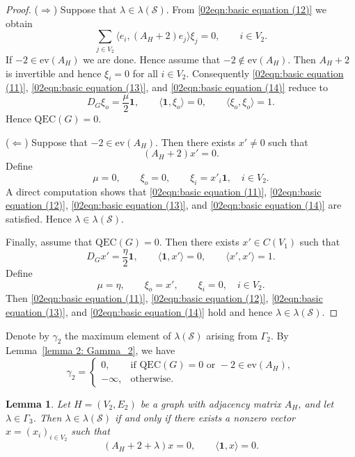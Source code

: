 \documentclass[pdflatex,sn-mathphys-num]{sn-jnl}
\theoremstyle{thmstyleone}%
\newtheorem{lemma}[theorem]{Lemma}%
\theoremstyle{thmstyletwo}%
\theoremstyle{thmstylethree}%
\begin{document}
\begin{proof}

\noindent
($\Rightarrow$)
Suppose that $\lambda\in \lambda(\mathcal S)$.
From \eqref{02eqn:basic equation (12)} we obtain
\[
\sum_{j\in V_2}\langle e_i,(A_H+2)e_j\rangle\xi_j=0, \qquad i\in V_2.
\]
If $-2\in\mathrm{ev}(A_H)$ we are done. 
Hence assume that $-2\notin\mathrm{ev}(A_H)$.
Then $A_H+2$ is invertible and hence $\xi_i=0$ for all $i\in V_2$.
Consequently \eqref{02eqn:basic equation (11)}, 
\eqref{02eqn:basic equation (13)}, and
\eqref{02eqn:basic equation (14)} reduce to
\[
D_G\xi_o=\frac{\mu}{2}\mathbf{1},\qquad
\langle \mathbf{1},\xi_o\rangle=0,\qquad
\langle \xi_o,\xi_o\rangle=1.
\]
Hence $\mathrm{QEC}(G)=0$.

\medskip

\noindent
($\Leftarrow$)
Suppose that $-2\in\mathrm{ev}(A_H)$.
Then there exists $x'\neq0$ such that
\[
(A_H+2)x'=0 .
\]
Define
\[
\mu=0,\qquad
\xi_o=0,\qquad
\xi_i=x'_i\mathbf 1 ,\quad i\in V_2 .
\]
A direct computation shows that
\eqref{02eqn:basic equation (11)}, \eqref{02eqn:basic equation (12)}, \eqref{02eqn:basic equation (13)}, and \eqref{02eqn:basic equation (14)}
are satisfied.
Hence $\lambda\in\lambda(\mathcal S)$.

Finally, assume that $\mathrm{QEC}(G)=0$.
Then there exists $x'\in C(V_1)$ such that
\[
D_Gx'=\frac{\eta}{2}\mathbf 1,\qquad
\langle \mathbf{1},x'\rangle=0,\qquad
\langle x',x'\rangle=1 .
\]
Define
\[
\mu=\eta,\qquad
\xi_o=x',\qquad
\xi_i=0,\quad i\in V_2 .
\]
Then \eqref{02eqn:basic equation (11)}, \eqref{02eqn:basic equation (12)}, \eqref{02eqn:basic equation (13)}, and \eqref{02eqn:basic equation (14)}
hold and hence $\lambda\in\lambda(\mathcal S)$.
\end{proof}
Denote by $\gamma_2$ the maximum element of $\lambda(\mathcal S)$ arising from $\Gamma_2$. 
By Lemma~\ref{lemma 2: Gamma_2}, we have
\[
\gamma_2=
\begin{cases}
0, & \text{if } \mathrm{QEC}(G)=0 \text{ or } -2\in \mathrm{ev}(A_H),\\
-\infty, & \text{otherwise}.
\end{cases}
\]
\begin{lemma}\label{lemma 3: Gamma_3}
Let $H=(V_2,E_2)$ be a graph with adjacency matrix $A_H$, and let $\lambda \in \Gamma_3$. 
Then $\lambda \in \lambda(\mathcal S)$ if and only if there exists a nonzero vector
$x=(x_i)_{i\in V_2}$ such that
\[
(A_H + 2 + \lambda)x = 0, \qquad \langle \mathbf 1, x \rangle = 0.
\]
\end{lemma}
\end{document}
